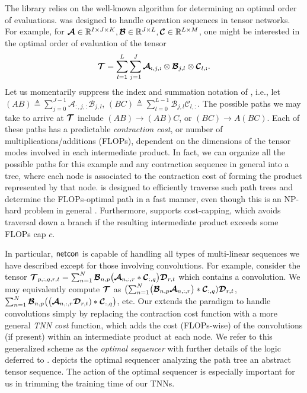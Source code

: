 The \opteinsum library relies on the well-known \netcon \citep{pfeifer2014faster} algorithm for determining an optimal order of evaluations. \netcon was designed to handle operation sequences in tensor networks. For example, for $\bm{\mathcal{A}} \in \mathbb{R}^{I \times J \times K}, \bm{\mathcal{B}} \in \mathbb{R}^{J \times L}, \bm{\mathcal{C}} \in \mathbb{R}^{L \times M}$, one might be interested in the optimal order of evaluation of the tensor
\begingroup
\abovedisplayskip=5pt
\belowdisplayskip=5pt
\begin{equation}
\label{eq:net-consequence}
\bm{\mathcal{T}} = \sum_{l = 1}^{L} \sum_{j = 1}^{J}
\bm{\mathcal{A}}_{\bm{:}, j, \bm{:}} \otimes \bm{\mathcal{B}}_{j,l} \otimes \bm{\mathcal{C}}_{l, \bm{:}}.
\end{equation}
\endgroup
Let us momentarily suppress the index and summation notation of , i.e., let $(AB) \triangleq \sum_{j=0}^{J-1}\mathcal{A}_{:,j,:}\mathcal{B}_{j,l}$, $(BC)\triangleq \sum_{l=0}^{L-1}\mathcal{B}_{j,l}\mathcal{C}_{l,:}$. The possible paths we may take to arrive at $\bm{\mathcal{T}}$ include $(AB)\rightarrow (AB)C$, or $(BC)\rightarrow A(BC)$. Each of these paths has a predictable \textit{contraction cost}, or number of multiplications/additions (FLOPs), dependent on the dimensions of the tensor modes involved in each intermediate product. In fact, we can organize all the possible paths for this example and any contraction sequence in general into a tree, where each node is associated to the contraction cost of forming the product represented by that node. \netcon is designed to efficiently traverse such path trees and determine the FLOPs-optimal path in a fast manner, even though this is an NP-hard problem in general \citep{chi1997optimizing}. Furthermore, \netcon supports cost-capping, which avoids traversal down a branch if the resulting intermediate product exceeds some FLOPs cap $c$. 

In particular, $\textsf{netcon}$ is capable of handling all types of multi-linear sequences we have described except for those involving convolutions. For example, consider the tensor $\bm{\mathcal{T}}_{p,:,q,r,t}=\sum_{n=1}^N \bm{\mathcal{B}}_{n,p}\bigl(\bm{\mathcal{A}}_{n,:,r} \ast \bm{\mathcal{C}}_{:,q}\bigr)\bm{\mathcal{D}}_{r,t}$ which contains a convolution. We may equivalently compute $\bm{\mathcal{T}}$ as
$
\bigl(\sum_{n=1}^N \bigl(\bm{\mathcal{B}}_{n,p}\bm{\mathcal{A}}_{n,:,r}\bigr)\ast \bm{\mathcal{C}}_{:,q})\bm{\mathcal{D}}_{r,t}$, %
$\sum_{n = 1}^N\bm{\mathcal{B}}_{n,p}\bigl(\bigl(\bm{\mathcal{A}}_{n,:,r}\bm{\mathcal{D}}_{r,t})\ast \bm{\mathcal{C}}_{:,q}\bigr)$,
etc. Our \conveinsum extends the \netcon paradigm to handle convolutions simply by replacing the contraction cost function with a more general \textit{TNN cost} function, which adds the cost (FLOPs-wise) of the convolutions (if present) within an intermediate product at each node. We refer to this generalized scheme as the \textit{optimal sequencer} with further details of the logic deferred to .  depicts the optimal sequencer analyzing the path tree an abstract tensor sequence. The action of the optimal sequencer is especially important for us in trimming the training time of our TNNs.


